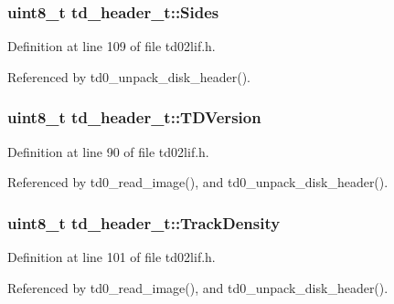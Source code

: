 \subsubsection[{\texorpdfstring{Sides}{Sides}}]{\setlength{\rightskip}{0pt plus 5cm}uint8\+\_\+t td\+\_\+header\+\_\+t\+::\+Sides}\hypertarget{structtd__header__t_a8b188d880b5d9d94122674265b0ca3e6}{}\label{structtd__header__t_a8b188d880b5d9d94122674265b0ca3e6}


Definition at line 109 of file td02lif.\+h.



Referenced by td0\+\_\+unpack\+\_\+disk\+\_\+header().

\subsubsection[{\texorpdfstring{T\+D\+Version}{TDVersion}}]{\setlength{\rightskip}{0pt plus 5cm}uint8\+\_\+t td\+\_\+header\+\_\+t\+::\+T\+D\+Version}\hypertarget{structtd__header__t_ac63e3625279d7262e3d094c0c5e5753a}{}\label{structtd__header__t_ac63e3625279d7262e3d094c0c5e5753a}


Definition at line 90 of file td02lif.\+h.



Referenced by td0\+\_\+read\+\_\+image(), and td0\+\_\+unpack\+\_\+disk\+\_\+header().

\subsubsection[{\texorpdfstring{Track\+Density}{TrackDensity}}]{\setlength{\rightskip}{0pt plus 5cm}uint8\+\_\+t td\+\_\+header\+\_\+t\+::\+Track\+Density}\hypertarget{structtd__header__t_a2d1461bb956665d519d33fca629477ab}{}\label{structtd__header__t_a2d1461bb956665d519d33fca629477ab}


Definition at line 101 of file td02lif.\+h.



Referenced by td0\+\_\+read\+\_\+image(), and td0\+\_\+unpack\+\_\+disk\+\_\+header().

